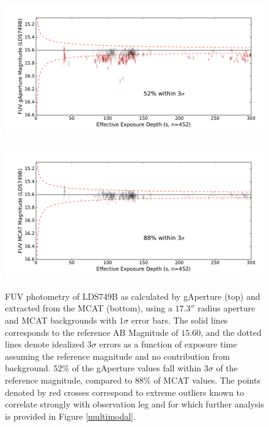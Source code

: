 \documentclass[preprint]{aastex}
\begin{document}
\begin{figure}[t!]
\includegraphics[scale=0.625]{Fig07a.pdf}\\\\
\includegraphics[scale=0.625]{Fig07b.pdf}
\caption{FUV photometry of LDS749B as calculated by gAperture (top) and extracted from the MCAT (bottom), using a $17.3''$ radius aperture and MCAT backgrounds with $1\sigma$ error bars. The solid lines corresponds to the reference AB Magnitude of $15.60$, and the dotted lines denote idealized $3\sigma$ errors as a function of exposure time assuming the reference magnitude and no contribution from background. $52\%$ of the gAperture values fall within $3\sigma$ of the reference magnitude, compared to $88\%$ of MCAT values. The points denoted by red crosses correspond to extreme outliers known to correlate strongly with observation leg and for which further analysis is provided in Figure \ref{multimodal}.
\label{ldsabsphotfuv}}
\end{figure}
\clearpage
\end{document}
